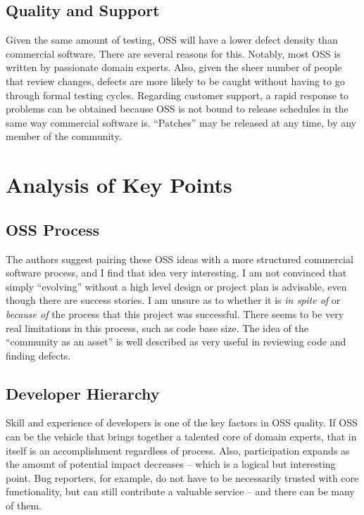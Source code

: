 \documentclass{article}
\begin{document}
\subsection{Quality and Support} Given the same amount of testing, OSS will have a lower defect density than commercial software. There are several reasons for this. Notably, most OSS is written by passionate domain experts. Also, given the sheer number of people that review changes, defects are more likely to be caught without having to go through formal testing cycles. Regarding customer support, a rapid response to problems can be obtained because OSS is not bound to release schedules in the same way commercial software is. ``Patches'' may be released at any time, by any member of the community.

\section{Analysis of Key Points}

\subsection{OSS Process}
The authors suggest pairing these OSS ideas with a more structured commercial software process, and I find that idea very interesting. I am not convinced that simply ``evolving'' without a high level design or project plan is advisable, even though there are success stories. I am unsure as to whether it is {\it in spite of} or {\it because of} the process that this project was successful. There seems to be very real limitations in this process, such as code base size. The idea of the ``community as an asset'' is well described as very useful in reviewing code and finding defects.

\subsection{Developer Hierarchy}
Skill and experience of developers is one of the key factors in OSS quality\cite{hedberg2007assuring}. If OSS can be the vehicle that brings together a talented core of domain experts, that in itself is an accomplishment regardless of process. Also, participation expands as the amount of potential impact decreases -- which is a logical but interesting point. Bug reporters, for example, do not have to be necessarily trusted with core functionality, but can still contribute a valuable service -- and there can be many of them.
   
\end{document}
